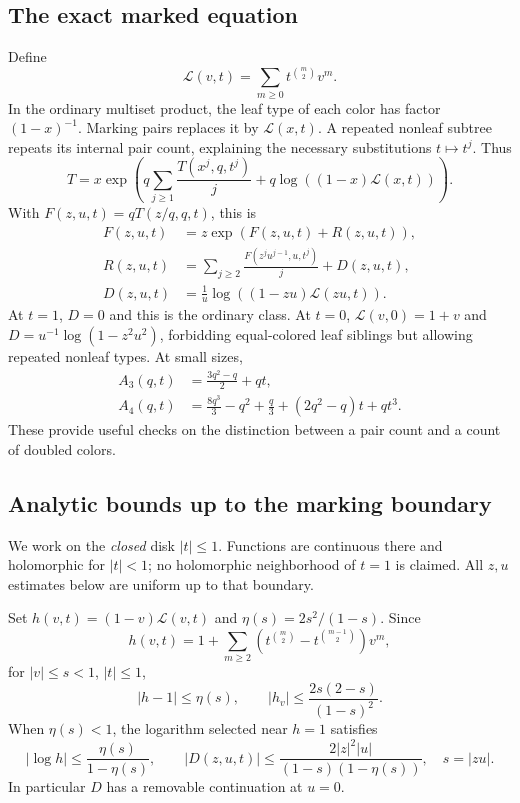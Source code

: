 \documentclass[11pt]{article}
\theoremstyle{definition}
\begin{document}
\subsection{The exact marked equation}
Define
\[
 \mathcal L(v,t)=\sum_{m\ge0}t^{\binom m2}v^m.
\]
In the ordinary multiset product, the leaf type of each color has factor $(1-x)^{-1}$. Marking pairs replaces it by $\mathcal L(x,t)$. A repeated nonleaf subtree repeats its internal pair count, explaining the necessary substitutions $t\mapsto t^j$. Thus
\begin{equation}\label{mct:eq:markedT}
 T=x\exp\left(q\sum_{j\ge1}\frac{T(x^j,q,t^j)}j
                   +q\log((1-x)\mathcal L(x,t))\right).
\end{equation}
With $F(z,u,t)=qT(z/q,q,t)$, this is
\begin{align}
 F(z,u,t)&=z\exp(F(z,u,t)+R(z,u,t)),\label{mct:eq:markedF}\\
 R(z,u,t)&=\sum_{j\ge2}\frac{F(z^ju^{j-1},u,t^j)}j+D(z,u,t),\\
 D(z,u,t)&=\frac1u\log((1-zu)\mathcal L(zu,t)).\label{mct:eq:D}
\end{align}
At $t=1$, $D=0$ and this is the ordinary class. At $t=0$, $\mathcal L(v,0)=1+v$ and $D=u^{-1}\log(1-z^2u^2)$, forbidding equal-colored leaf siblings but allowing repeated nonleaf types. At small sizes,
\begin{align*}
 A_3(q,t)&=\frac{3q^2-q}{2}+qt,\\
 A_4(q,t)&=\frac{8q^3}{3}-q^2+\frac q3+(2q^2-q)t+qt^3.
\end{align*}
These provide useful checks on the distinction between a pair count and a count of doubled colors.

\subsection{Analytic bounds up to the marking boundary}
We work on the \emph{closed} disk $|t|\le1$. Functions are continuous there and holomorphic for $|t|<1$; no holomorphic neighborhood of $t=1$ is claimed. All $z,u$ estimates below are uniform up to that boundary.

Set $h(v,t)=(1-v)\mathcal L(v,t)$ and $\eta(s)=2s^2/(1-s)$. Since
\[
 h(v,t)=1+\sum_{m\ge2}\left(t^{\binom m2}-t^{\binom{m-1}2}\right)v^m,
\]
for $|v|\le s<1$, $|t|\le1$,
\begin{equation}\label{mct:eq:hbound}
 |h-1|\le\eta(s),\qquad |h_v|\le\frac{2s(2-s)}{(1-s)^2}.
\end{equation}
When $\eta(s)<1$, the logarithm selected near $h=1$ satisfies
\[
 |\log h|\le\frac{\eta(s)}{1-\eta(s)},\qquad
 |D(z,u,t)|\le\frac{2|z|^2|u|}{(1-s)(1-\eta(s))},\quad s=|zu|.
\]
In particular $D$ has a removable continuation at $u=0$.
\end{document}
